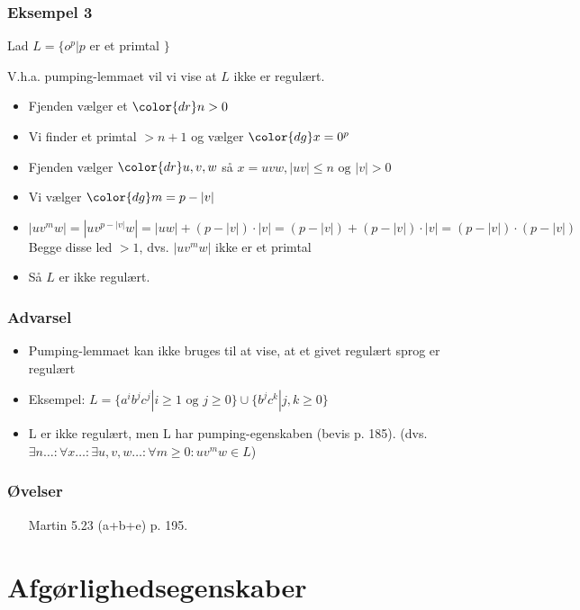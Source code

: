 \begin{frame}
\frametitle{Eksempel 3}
Lad $L = \{o^p | p $ er et primtal $ \}$

V.h.a. pumping-lemmaet vil vi vise at $L$ ikke er regulært.

\begin{itemize}[<+->]
\item Fjenden vælger et ${\color{dr}n}> 0$
\item Vi finder et primtal $>n+1$ og vælger ${\color{dg}x=0^p}$
\item Fjenden vælger ${\color{dr}u,v,w}$ så $x=uvw, |uv|\leq n \text{ og } |v| > 0$
\item Vi vælger ${\color{dg}m=p-|v|}$
\item $|uv^mw| = |uv^{p-|v|}w|=|uw|+(p-|v|)\cdot |v| = (p-|v|) + (p-|v|)\cdot |v|
  =(p-|v|)\cdot(p-|v|)$ Begge disse led $>1$, dvs. $|uv^mw|$ ikke er et primtal
\item Så $L$ er \alert{ikke} regulært.
\end{itemize}
\end{frame}

\begin{frame}
\frametitle{Advarsel}
\begin{itemize}[<+->]
\item  Pumping-lemmaet kan \alert{ikke} bruges til at vise, at  
et givet regulært sprog er regulært 
\item Eksempel: 
 $L = \{ a^ib^jc^j | i\geq 1\text{ og }j\geq 0 \} \cup \{ b^jc^k | j,k\geq 0 \}$
\item L er ikke regulært, men L har pumping-egenskaben (bevis p. 185).
(dvs. $\exists n\ldots:  \forall x\ldots:  \exists u,v,w\ldots:  \forall m\geq 0: uv^mw \in L$)
\end{itemize}
\end{frame}
\begin{frame}
\frametitle{Øvelser}
\begin{itemize}
\item [Martin] 5.23 (a+b+e) p. 195.
\end{itemize}
\end{frame}
\section{Afgørlighedsegenskaber}


